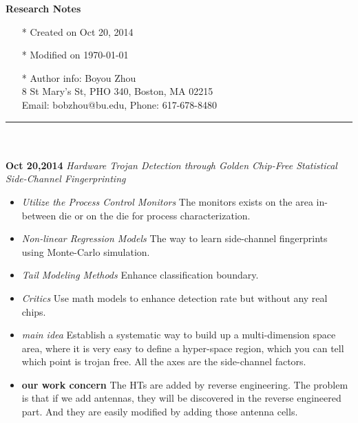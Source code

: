 \documentclass[]{article}
\begin{document}
\pagestyle{empty}
{\large\textbf{Research Notes}}
\begin{itemize}
    \item[*] Created on Oct 20, 2014
    \item[*] Modified on \today
    \item[*] Author info: Boyou Zhou\\
             8 St Mary's St, PHO 340, Boston, MA 02215\\
             Email: bobzhou@bu.edu, Phone: 617-678-8480
\end{itemize}


\rule[-0.1cm]{7.5in}{0.01cm}\\
\\
\noindent \textbf{Oct 20,2014}
\textit{Hardware Trojan Detection through Golden Chip-Free Statistical Side-Channel Fingerprinting}
\indent		\begin{itemize}
                \item \textit{Utilize the Process Control Monitors} The monitors exists on the area
                        in-between die or on the die for process characterization.
                \item \textit{Non-linear Regression Models} The way to learn side-channel fingerprints
                        using Monte-Carlo simulation.
                \item \textit{Tail Modeling Methods} Enhance classification boundary.
                \item \textit{Critics} Use math models to enhance detection rate but without any 
                        real chips.
                \item \textit{main idea} Establish a systematic way to build up a multi-dimension
                        space area, where it is very easy to define a hyper-space region, which you
                        can tell which point is trojan free. All the axes are the side-channel factors.
                \item \textbf{our work concern} The HTs are added by reverse engineering. The problem 
                        is that if we add antennas, they will be discovered in the reverse engineered
                        part. And they are easily modified by adding those antenna cells.

            \end{itemize}
\end{document}
